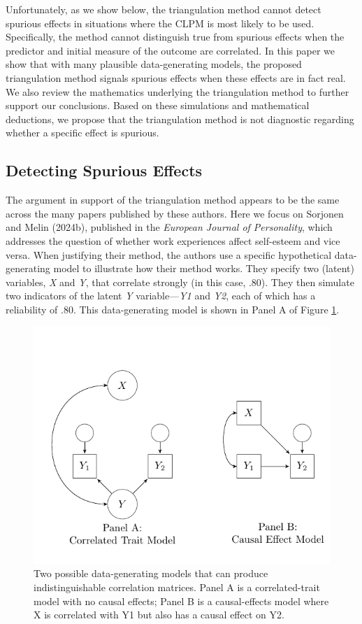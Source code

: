 \documentclass[
  man,floatsintext]{apa6}
\begin{document}
Unfortunately, as we show below, the triangulation method cannot detect spurious effects in situations where the CLPM is most likely to be used. Specifically, the method cannot distinguish true from spurious effects when the predictor and initial measure of the outcome are correlated. In this paper we show that with many plausible data-generating models, the proposed triangulation method signals spurious effects when these effects are in fact real. We also review the mathematics underlying the triangulation method to further support our conclusions. Based on these simulations and mathematical deductions, we propose that the triangulation method is not diagnostic regarding whether a specific effect is spurious.

\subsection{Detecting Spurious Effects}\label{detecting-spurious-effects}

The argument in support of the triangulation method appears to be the same across the many papers published by these authors. Here we focus on Sorjonen and Melin (2024b), published in the \emph{European Journal of Personality}, which addresses the question of whether work experiences affect self-esteem and vice versa. When justifying their method, the authors use a specific hypothetical data-generating model to illustrate how their method works. They specify two (latent) variables, \emph{X} and \emph{Y}, that correlate strongly (in this case, .80). They then simulate two indicators of the latent \emph{Y} variable---\emph{Y1} and \emph{Y2}, each of which has a reliability of .80. This data-generating model is shown in Panel A of Figure \ref{fig:dgm}.

\begin{figure}
\centering
\includegraphics{images/dgm.pdf}
\caption{\label{fig:dgm}Two possible data-generating models that can produce indistinguishable correlation matrices. Panel A is a correlated-trait model with no causal effects; Panel B is a causal-effects model where X is correlated with Y1 but also has a causal effect on Y2.}
\end{figure}
\end{document}

